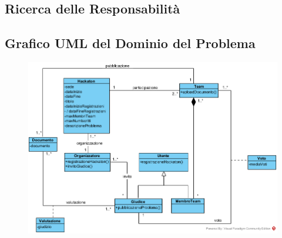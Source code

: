 \documentclass[a4paper, 15pt, oneside]{article}
\begin{document}
	\subsection{Ricerca delle Responsabilità}
	\newpage
	\subsection{Grafico UML del Dominio del Problema}
	\begin{figure}[H]
		\includegraphics[width=1\textwidth]{../Immagini/Homework1_UMLObject}
	\end{figure}
	
\end{document}
